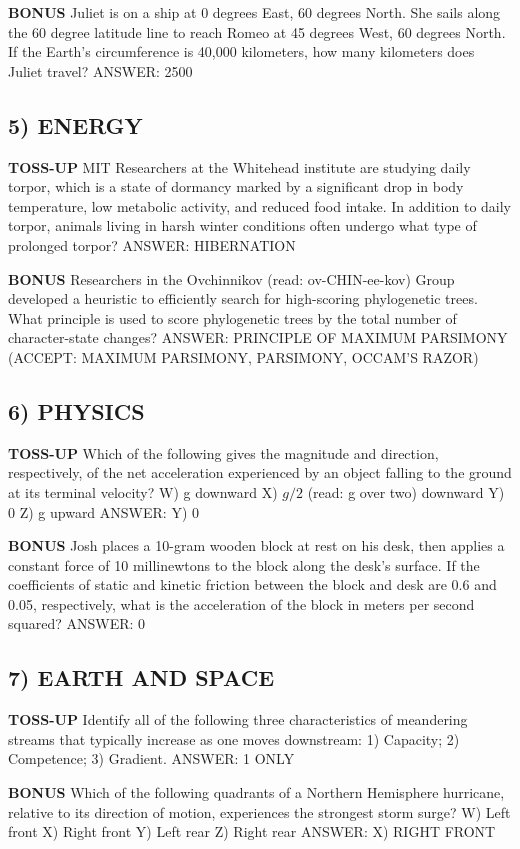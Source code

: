 \documentclass{article}
\begin{document}
\textbf{BONUS}
Juliet is on a ship at 0 degrees East, 60 degrees North. She sails along the 60 degree latitude line to reach Romeo at 45 degrees West, 60 degrees North. If the Earth's circumference is 40,000 kilometers, how many kilometers does Juliet travel?
ANSWER: 2500

\subsection*{5) ENERGY}
\textbf{TOSS-UP}
MIT Researchers at the Whitehead institute are studying daily torpor, which is a state of dormancy marked by a significant drop in body temperature, low metabolic activity, and reduced food intake. In addition to daily torpor, animals living in harsh winter conditions often undergo what type of prolonged torpor?
ANSWER: HIBERNATION

\textbf{BONUS}
Researchers in the Ovchinnikov (read: ov-CHIN-ee-kov) Group developed a heuristic to efficiently search for high-scoring phylogenetic trees. What principle is used to score phylogenetic trees by the total number of character-state changes?
ANSWER: PRINCIPLE OF MAXIMUM PARSIMONY (ACCEPT: MAXIMUM PARSIMONY, PARSIMONY, OCCAM'S RAZOR)

\subsection*{6) PHYSICS}
\textbf{TOSS-UP}
Which of the following gives the magnitude and direction, respectively, of the net acceleration experienced by an object falling to the ground at its terminal velocity?
W) g downward
X) $g/2$ (read: g over two) downward
Y) 0
Z) g upward
ANSWER: Y) 0

\textbf{BONUS}
Josh places a 10-gram wooden block at rest on his desk, then applies a constant force of 10 millinewtons to the block along the desk's surface. If the coefficients of static and kinetic friction between the block and desk are 0.6 and 0.05, respectively, what is the acceleration of the block in meters per second squared?
ANSWER: 0

\subsection*{7) EARTH AND SPACE}
\textbf{TOSS-UP}
Identify all of the following three characteristics of meandering streams that typically increase as one moves downstream: 1) Capacity; 2) Competence; 3) Gradient.
ANSWER: 1 ONLY

\textbf{BONUS}
Which of the following quadrants of a Northern Hemisphere hurricane, relative to its direction of motion, experiences the strongest storm surge?
W) Left front
X) Right front
Y) Left rear
Z) Right rear
ANSWER: X) RIGHT FRONT
\end{document}

